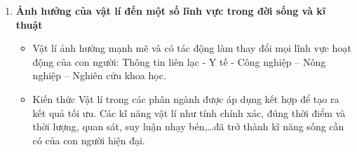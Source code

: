 \begin{enumerate}[label=\bfseries\arabic*.]
\begin{itemize}
	\end{itemize}
\item \textbf{Ảnh hưởng của vật lí đến một số lĩnh vực trong đời sống và kĩ thuật}\\
\begin{itemize}
	\item Vật lí ảnh hưởng mạnh mẽ và có tác động làm thay đổi mọi lĩnh vực hoạt động của con người: Thông tin liên lạc - Y tế - Công nghiệp – Nông nghiệp – Nghiên cứu khoa học.
	\item Kiến thức Vật lí trong các phân ngành được áp dụng kết hợp để tạo ra kết quả tối ưu. Các kĩ năng vật lí như tính chính xác, đúng	thời điểm và thời lượng, quan sát, suy luận nhạy bén,\dots đã trở
	thành kĩ năng sống cần có của con người hiện đại.
\end{itemize}
\end{enumerate}

